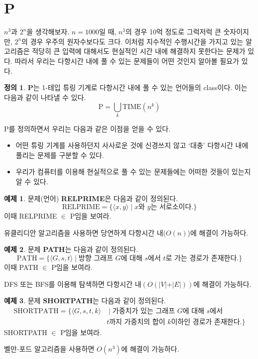 \documentclass[b5paper]{book}
\theoremstyle{definition}
\newtheorem{defn}{정의}[chapter]
\newtheorem{ex}{예제}[chapter]
\newenvironment{pf*}{\pushQED{\qed}\pf}{\popQED\endpf}
\begin{document}
\section{P}
$n^3$과 $2^n$을 생각해보자. $n=1000$일 때, $n^3$의 경우 10억 정도로 그럭저럭 큰
숫자이지만, $2^n$의 경우 우주의 원자수보다도 크다. 이처럼 지수적인 수행시간을 가지고
있는 알고리즘은 적당히 큰 입력에 대해서도 현실적인 시간 내에 해결하지 못한다는 문제가 있다.
따라서 우리는 다항시간 내에 풀 수 있는 문제들이 어떤 것인지 알아볼 필요가 있다.
\begin{defn}
    \textbf{P}는 1-테입 튜링 기계로 다항시간 내에 풀 수 있는 언어들의 class이다. 이는 다음과
    같이 나타낼 수 있다.
    $$\text{P} = \bigcup_k \text{TIME}(n^k)$$ 
\end{defn} 
P를 정의하면서 우리는 다음과 같은 이점을 얻을 수 있다.
\begin{itemize}
    \item 어떤 튜링 기계를 사용하던지 사사로운 것에 신경쓰지 않고 
    `대충' 다항시간 내에 풀리는 문제를 구분할 수 있다.
    \item 우리가 컴퓨터를 이용해 현실적으로 풀 수 있는 문제들에는 어떠한 것들이 있는지 알 수 있다. 
\end{itemize}
\begin{ex}
    문제(언어) \textbf{RELPRIME}은 다음과 같이 정의된다. 
    $$\text{RELPRIME} = \{\langle x,y \rangle  \;\vert\; x\text{와 } y\text{는 서로소이다.}\}$$
    이때 RELPRIME $\in $ P임을 보여라.  
\end{ex}
\begin{pf*}
    유클리디안 알고리즘을 사용하면 당연하게 다항시간 내($O(n)$)에 해결이 가능하다. 
\end{pf*}
\begin{ex}
    문제 \textbf{PATH}는 다음과 같이 정의된다.
    $$\text{PATH}= \{\langle G, s, t \rangle \;\vert\; \text{방향 그래프 } G\text{에 대해 }s
    \text{에서 }t\text{로 가는 경로가 존재한다.}\}$$
    이때 PATH $\in $ P임을 보여라.
\end{ex}
\begin{pf*}
    DFS 또는 BFS를 이용해 탐색하면 다항시간 내$(O(\vert V \vert + 
    \vert E \vert))$에 해결이 가능하다. 
\end{pf*}
\begin{ex}
    문제 \textbf{SHORTPATH}는 다음과 같이 정의된다.
    \begin{align*}
        \text{SHORTPATH} = \{ \langle G,s, t, k \rangle & \;\vert\; \text{가중치가 있는 그래프 }
          G \text{에 대해 } s \text{에서 } \\ 
        & t \text{까지 가중치의 합이 } k \text{이하인 경로가 존재한다.} \}
    \end{align*}
    SHORTPATH $\in $ P임을 보여라.
\end{ex}
\begin{pf*}
    벨만-포드 알고리즘을 사용하면 $O(n^3)$에 해결이 가능하다.
\end{pf*}
\end{document}
